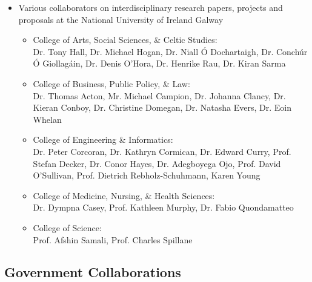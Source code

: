 \documentclass[10pt,a4paper]{res} %
\begin{document}
\begin{resume}
\begin{itemize}
\begin{itemize}
\end{itemize}
\item Various collaborators on interdisciplinary research papers, projects and proposals at the National University of Ireland Galway
\begin{itemize} \itemsep -2pt
\item College of Arts, Social Sciences, \& Celtic Studies: \\ Dr. Tony Hall, Dr. Michael Hogan, Dr. Niall \'{O} Dochartaigh, Dr. Conch\'{u}r \'{O} Giollag\'{a}in, Dr. Denis O'Hora, Dr. Henrike Rau, Dr. Kiran Sarma
\item College of Business, Public Policy, \& Law: \\ Dr. Thomas Acton, Mr. Michael Campion, Dr. Johanna Clancy, Dr. Kieran Conboy, Dr. Christine Domegan, Dr. Natasha Evers, Dr. Eoin Whelan
\item College of Engineering \& Informatics: \\ Dr. Peter Corcoran, Dr. Kathryn Cormican, Dr. Edward Curry, Prof. Stefan Decker, Dr. Conor Hayes, Dr. Adegboyega Ojo, Prof. David O'Sullivan, Prof. Dietrich Rebholz-Schuhmann, Karen Young
\item College of Medicine, Nursing, \& Health Sciences: \\ Dr. Dympna Casey, Prof. Kathleen Murphy, Dr. Fabio Quondamatteo
\item College of Science: \\ Prof. Afshin Samali, Prof. Charles Spillane
\end{itemize}
\end{itemize}

\subsection*{Government Collaborations}


\end{resume}
\end{document}
